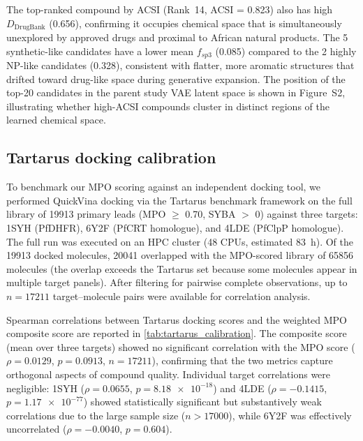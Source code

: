 \documentclass[11pt,a4paper]{article}
\begin{document}
The top-ranked compound by ACSI (Rank~14, ACSI = \num{0.823}) also has high $D_{\mathrm{DrugBank}}$ (\num{0.656}), confirming it occupies chemical space that is simultaneously unexplored by approved drugs and proximal to African natural products. The \num{5} synthetic-like candidates have a lower mean $f_{sp3}$ (\num{0.085}) compared to the \num{2} highly NP-like candidates (\num{0.328}), consistent with flatter, more aromatic structures that drifted toward drug-like space during generative expansion. The position of the top-20 candidates in the parent study VAE latent space is shown in Figure~S2, illustrating whether high-ACSI compounds cluster in distinct regions of the learned chemical space.

\subsection{Tartarus docking calibration}

To benchmark our MPO scoring against an independent docking tool, we performed QuickVina docking via the Tartarus benchmark framework \citep{tartarus_2024} on the full library of \num{19913} primary leads (MPO $\geq$ 0.70, SYBA $>$ 0) against three targets: 1SYH (PfDHFR), 6Y2F (PfCRT homologue), and 4LDE (PfClpP homologue). The full run was executed on an HPC cluster (\num{48} CPUs, estimated \SI{83}{\hour}). Of the \num{19913} docked molecules, \num{20041} overlapped with the MPO-scored library of \num{65856} molecules (the overlap exceeds the Tartarus set because some molecules appear in multiple target panels). After filtering for pairwise complete observations, up to $n = \num{17211}$ target--molecule pairs were available for correlation analysis.

Spearman correlations between Tartarus docking scores and the weighted MPO composite score are reported in \cref{tab:tartarus_calibration}. The composite score (mean over three targets) showed no significant correlation with the MPO score ($\rho = \num{0.0129}$, $p = \num{0.0913}$, $n = \num{17211}$), confirming that the two metrics capture orthogonal aspects of compound quality. Individual target correlations were negligible: 1SYH ($\rho = \num{0.0655}$, $p = \num{8.18e-18}$) and 4LDE ($\rho = -\num{0.1415}$, $p = \num{1.17e-77}$) showed statistically significant but substantively weak correlations due to the large sample size ($n > \num{17000}$), while 6Y2F was effectively uncorrelated ($\rho = -\num{0.0040}$, $p = \num{0.604}$).
\end{document}
